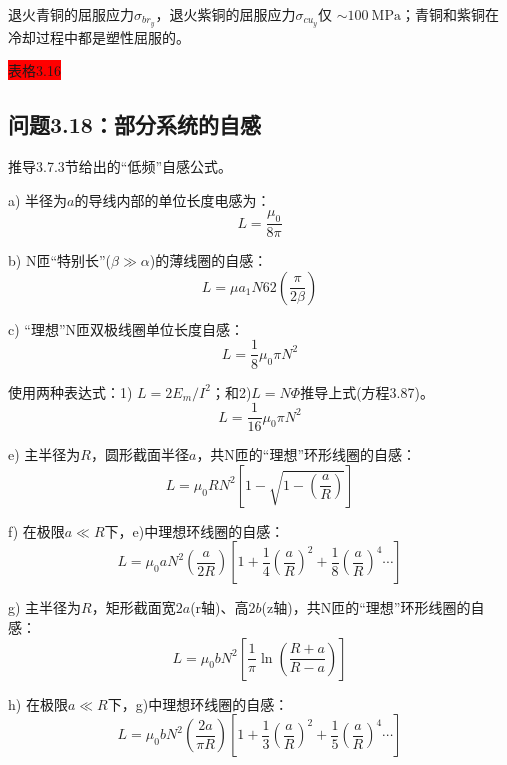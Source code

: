 退火青铜的屈服应力$\sigma_{br_y}$，退火紫铜的屈服应力$\sigma_{cu_y}$仅
$\sim 100\ \mathrm{MPa}$；青铜和紫铜在冷却过程中都是塑性屈服的。

\colorbox{red}{表格3.16}

\newpage



\subsection{问题3.18：部分系统的自感}
推导3.7.3节给出的“低频”自感公式。

a) 半径为$a$的导线内部的单位长度电感为：
 \begin{equation}%
L=\frac{\mu_0}{8\pi}
\end{equation}

b) N匝“特别长”($\beta\gg \alpha$)的薄线圈的自感：
 \begin{equation}%
L=\mu a_1N62\left(\frac{\pi}{2\beta}\right)
\end{equation}

c) “理想”N匝双极线圈单位长度自感：
 \begin{equation}%
L=\frac{1}{8}\mu_0\pi N^2
\end{equation}

使用两种表达式：1) $L= 2E_m/I^2$；和2)$ L=N\Phi$推导上式(方程3.87)。
\begin{equation}%
L=\frac{1}{16}\mu_0\pi N^2
\end{equation}

e) 主半径为$R$，圆形截面半径$a$，共N匝的“理想”环形线圈的自感：
 \begin{equation}%
L=\mu_0 R N^2\left[1-\sqrt{1-\left(\frac{a}{R}\right)}\right]
\end{equation}

f) 在极限$a\ll R$下，e)中理想环线圈的自感：
 \begin{equation}%
L=\mu_0aN^2(\frac{a}{2R})[1+\frac{1}{4}(\frac{a}{R})^2+\frac{1}{8}(\frac{a}{R})^4\cdots]
\end{equation}

g) 主半径为$R$，矩形截面宽$2a$(r轴)、高$2b$(z轴)，共N匝的“理想”环形线圈的自感：
 \begin{equation}%
L=\mu_0 b N^2\left[\frac{1}{\pi}\ln\left(\frac{R+a}{R-a}\right)\right]
\end{equation}

h) 在极限$a\ll R$下，g)中理想环线圈的自感：
 \begin{equation}%
L=\mu_0bN^2(\frac{2a}{\pi R})[1+\frac{1}{3}(\frac{a}{R})^2+\frac{1}{5}(\frac{a}{R})^4\cdots]
\end{equation}

